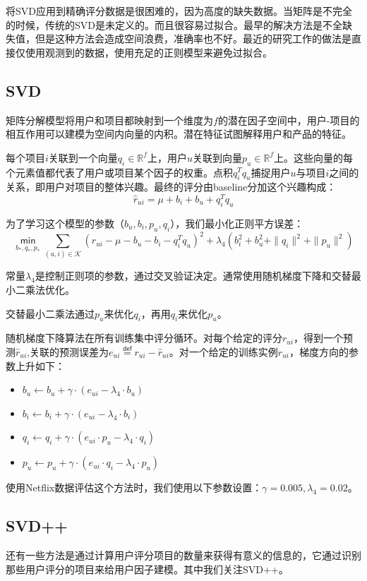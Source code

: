 \documentclass{article}
\begin{document}
 将SVD应用到精确评分数据是很困难的，因为高度的缺失数据。当矩阵是不完全的时候，传统的SVD是未定义的。而且很容易过拟合。最早的解决方法是不全缺失值，但是这种方法会造成空间浪费，准确率也不好。最近的研究工作的做法是直接仅使用观测到的数据，使用充足的正则模型来避免过拟合。

 \subsection{SVD}
 矩阵分解模型将用户和项目都映射到一个维度为$f$的潜在因子空间中，用户-项目的相互作用可以建模为空间内向量的内积。潜在特征试图解释用户和产品的特征。

 每个项目$i$关联到一个向量$q_i\in\mathbb{R}^f$上，用户$u$关联到向量$p_u\in\mathbb{R}^f$上。这些向量的每个元素值都代表了用户或项目某个因子的权重。点积$q_i^Tq_u$捕捉用户$u$与项目$i$之间的关系，即用户对项目的整体兴趣。最终的评分由baseline分加这个兴趣构成：
 $$ \hat{r}_{ui}=\mu+b_i+b_u+q_i^Tq_u $$

 为了学习这个模型的参数（$ b_u,b_i,p_u,q_i $），我们最小化正则平方误差：
 $$ \mathop{\mathsf{min}}\limits_{b_*,q_*,p_*}\mathop{\sum}\limits_{(u,i)\in\mathcal{K}}(r_{ui}-\mu-b_u-b_i-q_i^Tq_u)^2+\lambda_4(b_i^2+b_u^2+\|q_i\|^2+\|p_u\|^2) $$

 常量$\lambda_4$是控制正则项的参数，通过交叉验证决定。通常使用随机梯度下降和交替最小二乘法优化。

 交替最小二乘法通过$p_u$来优化$q_i$，再用$q_i$来优化$p_u$。

 随机梯度下降算法在所有训练集中评分循环。对每个给定的评分$r_{ui}$，得到一个预测$\hat{r}_{ui}$,关联的预测误差为$e_{ui}\mathop{=}\limits^{\mathsf{def}}r_{ui}-\hat{r}_{ui}$。对一个给定的训练实例$r_{ui}$，梯度方向的参数上升如下：
 \begin{itemize}
 \item $b_u\leftarrow b_u+\gamma\cdot(e_{ui}-\lambda_4\cdot b_u)$
 \item $b_i\leftarrow b_i+\gamma\cdot(e_{ui}-\lambda_4\cdot b_i)$
 \item $q_i\leftarrow q_i+\gamma\cdot(e_{ui}\cdot p_u-\lambda_4\cdot q_i)$
 \item $p_u\leftarrow p_u+\gamma\cdot(e_{ui}\cdot q_i-\lambda_4\cdot p_u)$
 \end{itemize}

 使用Netflix数据评估这个方法时，我们使用以下参数设置：$\gamma=0.005,\lambda_4=0.02$。

 \subsection{SVD++}
 还有一些方法是通过计算用户评分项目的数量来获得有意义的信息的，它通过识别那些用户评分的项目来给用户因子建模。其中我们关注SVD++。
\end{document}
